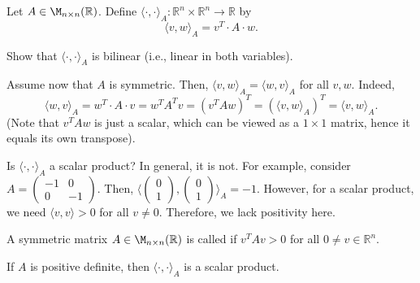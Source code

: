 \begin{example}
    Let $A \in \M_{n \times n}(\mathbb{R})$. Define $\langle \cdot, \cdot \rangle_A : \mathbb{R}^n \times \mathbb{R}^n \to \mathbb{R}$ by
    \begin{equation*}
        \langle v, w \rangle_A = v^T \cdot A \cdot w.
    \end{equation*}
    
    \begin{exercise}
        Show that $\langle \cdot, \cdot \rangle_A$ is bilinear (i.e., linear in both variables).
    \end{exercise}
    
    Assume now that $A$ is symmetric. Then, $\langle v, w \rangle_A = \langle w, v \rangle_A$ for all $v, w$. Indeed,
    \begin{equation*}
        \langle w, v \rangle_A = w^T \cdot A \cdot v = w^T A^T v = (v^T A w)^T = (\langle v, w \rangle_A)^T = \langle v, w \rangle_A.
    \end{equation*}
    (Note that $v^T A w$ is just a scalar, which can be viewed as a $1 \times 1$ matrix, hence it equals its own transpose). 
    
    Is $\langle \cdot, \cdot \rangle_A$ a scalar product? In general, it is not. For example, consider $A = \left(\begin{smallmatrix} -1 & 0 \\ 0 & -1 \end{smallmatrix}\right)$. Then, $\langle \left(\begin{smallmatrix} 0 \\ 1 \end{smallmatrix}\right), \left(\begin{smallmatrix} 0 \\ 1 \end{smallmatrix}\right) \rangle_A = -1$. However, for a scalar product, we need $\langle v, v \rangle > 0$ for all $v \neq 0$. Therefore, we lack positivity here.
\end{example}

\begin{definition}
    A symmetric matrix $A \in \M_{n \times n}(\mathbb{R})$ is called  if $v^T A v > 0$ for all $0 \neq v \in \mathbb{R}^n$.
\end{definition}

\begin{claim*}
    If $A$ is positive definite, then $\langle \cdot, \cdot \rangle_A$ is a scalar product.
\end{claim*}

